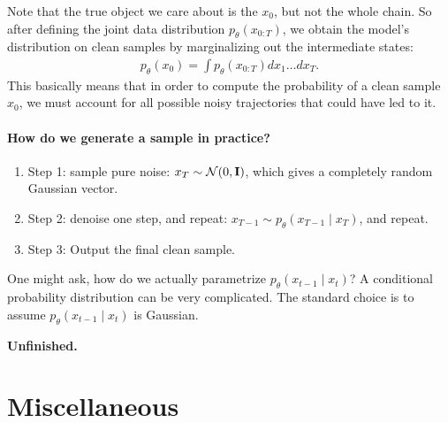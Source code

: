 \documentclass[11pt]{article}  %
\begin{document}
Note that the true object we care about is the $x_0$, but not the whole chain.
So after defining the joint data distribution $p_{\theta}(x_{0:T})$, we obtain the model's distribution on clean samples by marginalizing out the intermediate states:
\begin{align*}
  p_{\theta}(x_0) = \int p_{\theta}(x_{0:T}) dx_1 \hdots dx_T.
\end{align*}
This basically means that in order to compute the probability of a clean sample $x_0$, we must account for all possible noisy trajectories that could have led to it.


\paragraph{How do we generate a sample in practice?}

\begin{enumerate}
  \item Step 1: sample pure noise: $x_{T} \sim \mathcal{N}(0, \mathbf{I})$, which gives a completely random Gaussian vector. 
  \item Step 2: denoise one step, and repeat: $x_{T-1} \sim p_{\theta}(x_{T - 1} \mid x_T)$, and repeat.
  \item Step 3: Output the final clean sample.
\end{enumerate}

One might ask, how do we actually parametrize $p_{\theta}(x_{t-1} \mid x_t)$?
A conditional probability distribution can be very complicated.
The standard choice is to assume $p_\theta(x_{t-1} \mid x_t)$ is Gaussian.


\textbf{Unfinished.}


\section{Miscellaneous}
\end{document}
